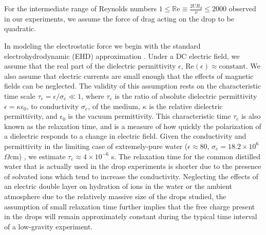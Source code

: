 \documentclass[aip,reprint, floatfix]{revtex4-1}
\begin{document}
For the intermediate range of Reynolds numbers $1 \leq \mathbb{R}\mbox{e} \equiv \frac{2UR_d}{\nu} \leq 2000 $ observed in our experiments, we assume the force of drag acting on the drop to be quadratic.

In modeling the electrostatic force we begin with the standard electrohydrodynamic (EHD) approximation \cite{saville_electrohydrodynamics:_1997}. Under a DC electric field, we assume that the real part of the dielectric permittivity $\epsilon$, $\mbox{Re} \left( \epsilon \right) \approx  \mbox{constant}$. We also assume that electric currents are small enough that the effects of magnetic fields can be neglected. The validity of this assumption rests on the characteristic time scale $\tau_e = \epsilon /\sigma_e \ll 1$, where $\tau_e$ is the ratio of absolute dielectric permittivity $\epsilon = \kappa \epsilon_0$, to conductivity $\sigma_e$, of the medium, $\kappa$ is the relative dielectric permittivity, and $\epsilon_0$ is the vacuum permittivity. This characteristic time $\tau_e$ is also known as the relaxation time, and is a measure of how quickly the polarization of a dielectric responds to a change in electric field. Given the conductivity and permittivity in the limiting case of extremely-pure water ($ \epsilon \approx 80$, $\sigma_e = 18.2 \times 10^{6}$ $\Omega\mbox{cm}$) \cite{yatsuzuka_electrification_1994}, we estimate $\tau_e \approx 4 \times 10^{-6}$ s. The relaxation time for the common distilled water that is actually used in the drop experiments is shorter due to the presence of solvated ions which tend to increase the conductivity. Neglecting the effects of an electric double layer on hydration of ions in the water or the ambient atmosphere due to the relatively massive size of the drops studied, the assumption of small relaxation time further implies that the free charge present in the drops will remain approximately constant during the typical time interval of a low-gravity experiment.
\end{document}
